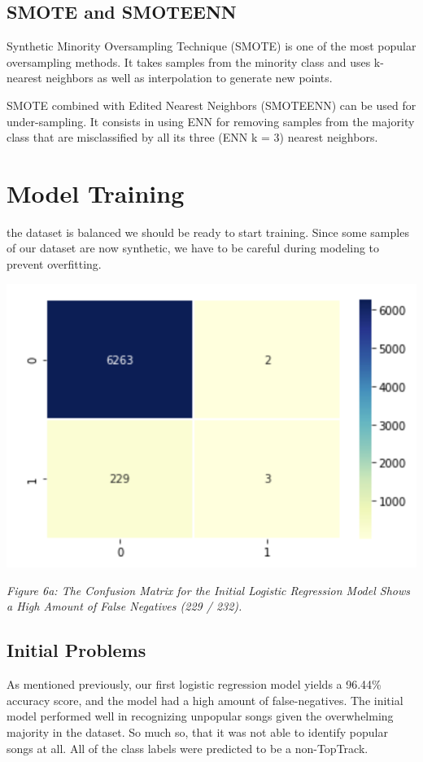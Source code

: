 \documentclass[12pt,journal]{IEEEtran}
\begin{document}
\subsection{SMOTE and SMOTEENN}
Synthetic Minority Oversampling Technique (SMOTE) is one of the most popular oversampling methods. It takes samples from the minority class and uses k-nearest neighbors as well as interpolation to generate new points.

SMOTE combined with Edited Nearest Neighbors (SMOTEENN) can be used for under-sampling. It consists in using ENN for removing samples from the majority class that are misclassified by all its three (ENN k = 3) nearest neighbors.


\section{Model Training}
 the dataset is balanced we should be ready to start training. Since some samples of our dataset are now synthetic, we have to be careful during modeling to prevent overfitting.

\begin{center}
	\includegraphics[width=.8\linewidth]{cm1}
	
	\textit{Figure 6a: The Confusion Matrix for the Initial Logistic Regression Model Shows a High Amount of False Negatives (229 / 232).}
\end{center}

\subsection{Initial Problems}
As mentioned previously, our first logistic regression model yields a 96.44\% accuracy score, and the model had a high amount of false-negatives. The initial model performed well in recognizing unpopular songs given the overwhelming majority in the dataset. So much so, that it was not able to identify popular songs at all. All of the class labels were predicted to be a non-TopTrack.
\end{document}
